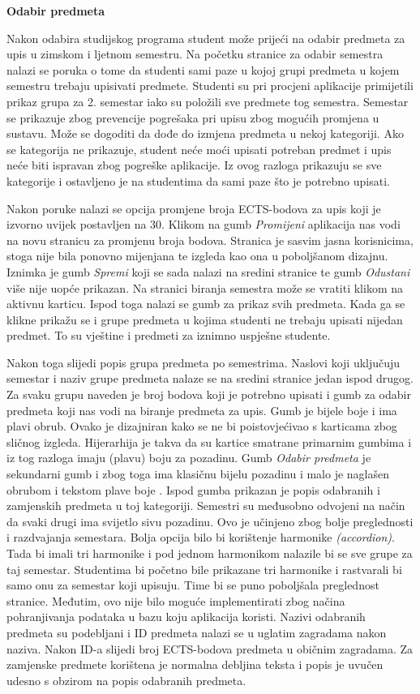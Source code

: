 \documentclass[times, utf8, zavrsni, numeric]{fer}
\begin{document}
    \noindent\textbf{Odabir predmeta}
    
    Nakon odabira studijskog programa student može prijeći na odabir predmeta za upis u zimskom i ljetnom semestru. Na početku stranice za odabir semestra nalazi se poruka o tome da studenti sami paze u kojoj grupi predmeta u kojem semestru trebaju upisivati predmete. Studenti su pri procjeni aplikacije primijetili prikaz grupa za 2. semestar iako su položili sve predmete tog semestra. Semestar se prikazuje zbog prevencije pogrešaka pri upisu zbog mogućih promjena u sustavu. Može se dogoditi da dođe do izmjena predmeta u nekoj kategoriji. Ako se kategorija ne prikazuje, student neće moći upisati potreban predmet i upis neće biti ispravan zbog pogreške aplikacije. Iz ovog razloga prikazuju se sve kategorije i ostavljeno je na studentima da sami paze što je potrebno upisati.
    
    Nakon poruke nalazi se opcija promjene broja ECTS-bodova za upis koji je izvorno uvijek postavljen na 30. Klikom na gumb \textit{Promijeni} aplikacija nas vodi na novu stranicu za promjenu broja bodova. Stranica je sasvim jasna korisnicima, stoga nije bila ponovno mijenjana te izgleda kao ona u poboljšanom dizajnu. Iznimka je gumb \textit{Spremi} koji se sada nalazi na sredini stranice te gumb \textit{Odustani} više nije uopće prikazan. Na stranici biranja semestra može se vratiti klikom na aktivnu karticu. Ispod toga nalazi se gumb za prikaz svih predmeta. Kada ga se klikne prikažu se i grupe predmeta u kojima studenti ne trebaju upisati nijedan predmet. To su vještine i predmeti za iznimno uspješne studente.
    
    Nakon toga slijedi popis grupa predmeta po semestrima. Naslovi koji uključuju semestar i naziv grupe predmeta nalaze se na sredini stranice jedan ispod drugog. Za svaku grupu naveden je broj bodova koji je potrebno upisati i gumb za odabir predmeta koji nas vodi na biranje predmeta za upis. Gumb je bijele boje i ima plavi obrub. Ovako je dizajniran kako se ne bi poistovjećivao s karticama zbog sličnog izgleda. Hijerarhija je takva da su kartice smatrane primarnim gumbima i iz tog razloga imaju (plavu) boju za pozadinu. Gumb \textit{Odabir predmeta} je sekundarni gumb i zbog toga ima klasičnu bijelu pozadinu i malo je naglašen obrubom i tekstom plave boje \cite{tips}. Ispod gumba prikazan je popis odabranih i zamjenskih predmeta u toj kategoriji. Semestri su međusobno odvojeni na način da svaki drugi ima svijetlo sivu pozadinu. Ovo je učinjeno zbog bolje preglednosti i razdvajanja semestara. Bolja opcija bilo bi korištenje harmonike \textit{(accordion)}. Tada bi imali tri harmonike i pod jednom harmonikom nalazile bi se sve grupe za taj semestar. Studentima bi početno bile prikazane tri harmonike i rastvarali bi samo onu za semestar koji upisuju. Time bi se puno poboljšala preglednost stranice. Međutim, ovo nije bilo moguće implementirati zbog načina pohranjivanja podataka u bazu koju aplikacija koristi. Nazivi odabranih predmeta su podebljani i ID predmeta nalazi se u uglatim zagradama nakon naziva. Nakon ID-a slijedi broj ECTS-bodova predmeta u običnim zagradama. Za zamjenske predmete korištena je normalna debljina teksta i popis je uvučen udesno s obzirom na popis odabranih predmeta. 
\end{document}
